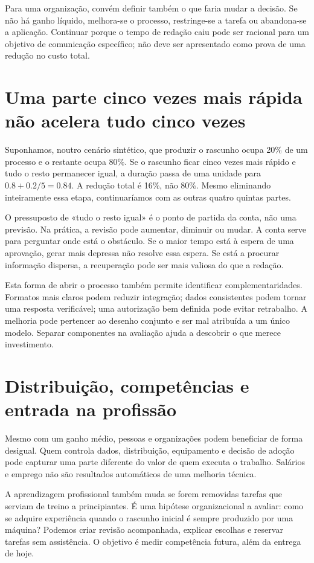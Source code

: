 Para uma organização, convém definir também o que faria mudar a decisão. Se não há ganho líquido, melhora-se o processo, restringe-se a tarefa ou abandona-se a aplicação. Continuar porque o tempo de redação caiu pode ser racional para um objetivo de comunicação específico; não deve ser apresentado como prova de uma redução no custo total.

\section{Uma parte cinco vezes mais rápida não acelera tudo cinco vezes}
Suponhamos, noutro cenário sintético, que produzir o rascunho ocupa 20\% de um processo e o restante ocupa 80\%. Se o rascunho ficar cinco vezes mais rápido e tudo o resto permanecer igual, a duração passa de uma unidade para $0.8+0.2/5=0.84$. A redução total é 16\%, não 80\%. Mesmo eliminando inteiramente essa etapa, continuaríamos com as outras quatro quintas partes.

O pressuposto de «tudo o resto igual» é o ponto de partida da conta, não uma previsão. Na prática, a revisão pode aumentar, diminuir ou mudar. A conta serve para perguntar onde está o obstáculo. Se o maior tempo está à espera de uma aprovação, gerar mais depressa não resolve essa espera. Se está a procurar informação dispersa, a recuperação pode ser mais valiosa do que a redação.

Esta forma de abrir o processo também permite identificar complementaridades. Formatos mais claros podem reduzir integração; dados consistentes podem tornar uma resposta verificável; uma autorização bem definida pode evitar retrabalho. A melhoria pode pertencer ao desenho conjunto e ser mal atribuída a um único modelo. Separar componentes na avaliação ajuda a descobrir o que merece investimento.

\section{Distribuição, competências e entrada na profissão}
Mesmo com um ganho médio, pessoas e organizações podem beneficiar de forma desigual. Quem controla dados, distribuição, equipamento e decisão de adoção pode capturar uma parte diferente do valor de quem executa o trabalho. Salários e emprego não são resultados automáticos de uma melhoria técnica.

A aprendizagem profissional também muda se forem removidas tarefas que serviam de treino a principiantes. É uma hipótese organizacional a avaliar: como se adquire experiência quando o rascunho inicial é sempre produzido por uma máquina? Podemos criar revisão acompanhada, explicar escolhas e reservar tarefas sem assistência. O objetivo é medir competência futura, além da entrega de hoje.

